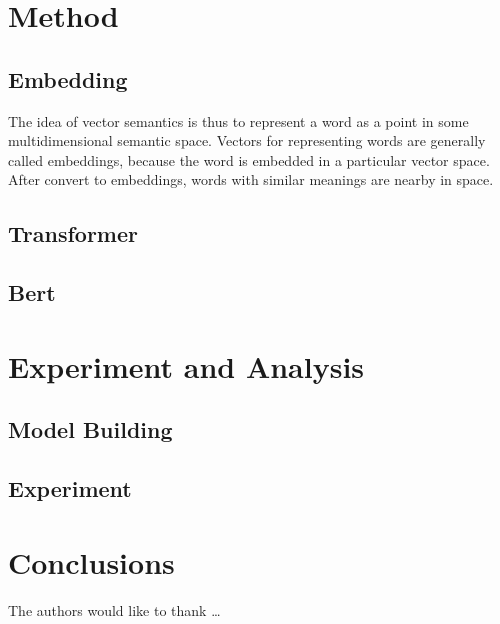\section{Method} \label{sec-method}
\subsection{Embedding}
The idea of vector semantics is thus to represent a word as a point in some multidimensional semantic space.
Vectors for representing words are generally called embeddings, because the word is embedded in a particular vector space.
After convert to embeddings, words with similar meanings are nearby in space.

\subsection{Transformer}
\subsection{Bert}
\section{Experiment and Analysis} \label{sec-experiment}
\subsection{Model Building}
\subsection{Experiment}
\section{Conclusions} \label{sec-conclusions}


The authors would like to thank \ldots

